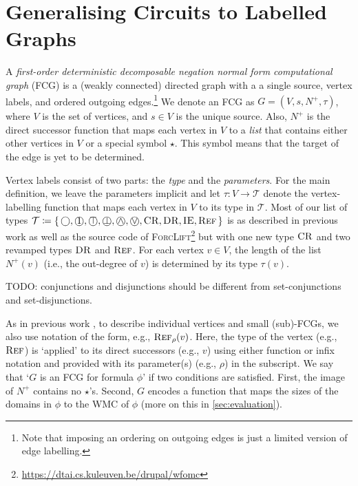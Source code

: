 \section{Generalising Circuits to Labelled Graphs}

A \emph{first-order deterministic decomposable negation normal form computational graph} (FCG) is a (weakly connected) directed graph with a a single source, vertex labels, and ordered outgoing edges.\footnote{Note that imposing an ordering on outgoing edges is just a limited version of edge labelling.} We denote an FCG as $G = (V, s, N^+, \tau)$, where $V$ is the set of vertices, and $s \in V$ is the unique source. Also, $N^+$ is the direct successor function that maps each vertex in $V$ to a \emph{list} that contains either other vertices in $V$ or a special symbol $\star$. This symbol means that the target of the edge is yet to be determined.

Vertex labels consist of two parts: the \emph{type} and the \emph{parameters}. For the main definition, we leave the parameters implicit and let $\tau\colon V \to \mathcal{T}$ denote the vertex-labelling function that maps each vertex in $V$ to its type in $\mathcal{T}$. Most of our list of types $\mathcal{T} \coloneqq \{\, \Smoothing, \Unit, \Tautology, \Contradiction, \oland, \olor, \CR, \DR, \IE, \Reff \,\}$ is as described in previous work \citep{DBLP:conf/nips/Broeck11,DBLP:conf/ijcai/BroeckTMDR11} as well as the source code of \textsc{ForcLift}\footnote{\url{https://dtai.cs.kuleuven.be/drupal/wfomc}} but with one new type $\operatorname{\textsc{CR}}$ and two revamped types $\operatorname{\textsc{DR}}$ and $\operatorname{\textsc{Ref}}$. For each vertex $v \in V$, the length of the list $N^+(v)$ (i.e., the out-degree of $v$) is determined by its type $\tau(v)$.

TODO: conjunctions and disjunctions should be different from set-conjunctions and set-disjunctions.

As in previous work \citep{DBLP:conf/ijcai/BroeckTMDR11}, to describe individual vertices and small (sub)-FCGs, we also use notation of the form, e.g., $\operatorname{\textsc{Ref}}_\rho(v)$. Here, the type of the vertex (e.g., $\operatorname{\textsc{Ref}}$) is `applied' to its direct successors (e.g., $v$) using either function or infix notation and provided with its parameter(s) (e.g., $\rho$) in the subscript. We say that `$G$ is an FCG for formula $\phi$' if two conditions are satisfied. First, the image of $N^+$ contains no $\star$'s. Second, $G$ encodes a function that maps the sizes of the domains in $\phi$ to the WMC of $\phi$ (more on this in \cref{sec:evaluation}).

